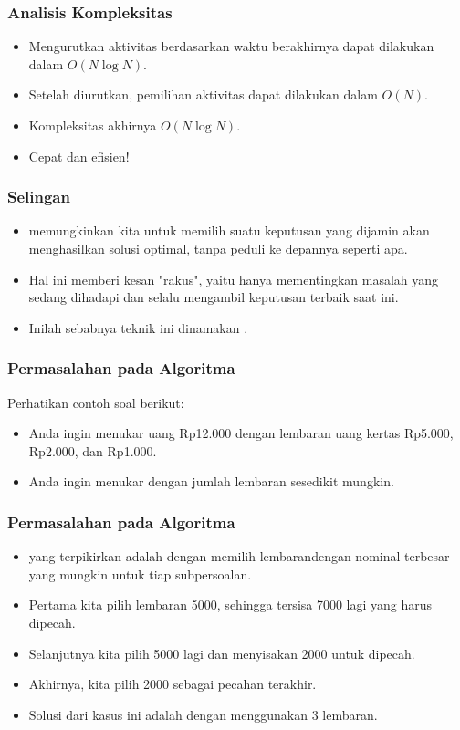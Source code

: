 \begin{frame}
  \frametitle{Analisis Kompleksitas}
  \begin{itemize}
    \item Mengurutkan aktivitas berdasarkan waktu berakhirnya dapat dilakukan dalam $O(N \log{N})$.
    \item Setelah diurutkan, pemilihan aktivitas dapat dilakukan dalam $O(N)$.
    \item Kompleksitas akhirnya $O(N \log{N})$.
    \item Cepat dan efisien!
  \end{itemize}
\end{frame}

\begin{frame}
  \frametitle{Selingan}
  \begin{itemize}
    \item \fGreedyChoice memungkinkan kita untuk memilih suatu keputusan yang dijamin akan menghasilkan solusi optimal, tanpa peduli ke depannya seperti apa.
    \item Hal ini memberi kesan "rakus", yaitu hanya mementingkan masalah yang sedang dihadapi dan selalu mengambil keputusan terbaik saat ini.
    \item Inilah sebabnya teknik ini dinamakan \fgreedy.
  \end{itemize}
\end{frame}

\begin{frame}
  \frametitle{Permasalahan pada Algoritma \fGreedy}
  Perhatikan contoh soal berikut:
  \begin{itemize}
    \item Anda ingin menukar uang Rp12.000 dengan lembaran uang kertas Rp5.000, Rp2.000, dan Rp1.000.
    \item Anda ingin menukar dengan jumlah lembaran sesedikit mungkin.
  \end{itemize}
\end{frame}

\begin{frame}
  \frametitle{Permasalahan pada Algoritma \fGreedy}
  \begin{itemize}
    \item \fGreedyChoice yang terpikirkan adalah dengan memilih lembarandengan nominal terbesar yang mungkin untuk tiap subpersoalan.
    \item Pertama kita pilih lembaran 5000, sehingga tersisa 7000 lagi yang harus dipecah.
    \item Selanjutnya kita pilih 5000 lagi dan menyisakan 2000 untuk dipecah.
    \item Akhirnya, kita pilih 2000 sebagai pecahan terakhir.
    \item Solusi dari kasus ini adalah dengan menggunakan 3 lembaran.
  \end{itemize}
\end{frame}

